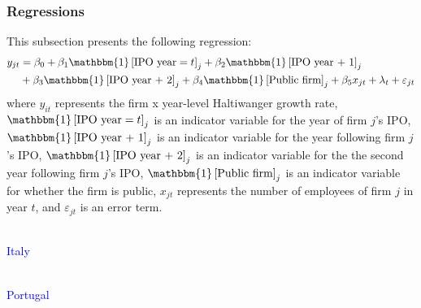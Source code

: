 \documentclass[12pt,notitlepage]{article}
\newcommand{\sym}[1] {\ifmmode^{#1} \else\(^{#1}\) \fi}
\begin{document}
\subsubsection{Regressions}
This subsection presents the following regression:
	\begin{equation}
	\begin{split}
	y_{jt} &= \beta_0 + \beta_1 \mathbbm{1}\left[ \text{IPO year} = t \right]_j + \beta_2 \mathbbm{1}\left[ \text{IPO year + 1}\right]_j \\
	&+ \beta_3 \mathbbm{1}\left[ \text{IPO year + 2} \right]_j + \beta_4 \mathbbm{1}\left[ \text{Public firm} \right]_j + \beta_5 x_{jt} + \lambda_t + \varepsilon_{jt}
	\end{split}
	\end{equation}
where $y_{it}$ represents the firm x year-level Haltiwanger growth rate, $\mathbbm{1}\left[ \text{IPO year} = t \right]_j$ is an indicator variable for the year of firm $j$'s IPO, $\mathbbm{1}\left[ \text{IPO year + 1}\right]_j $ is an indicator variable for the year following firm $j$'s IPO, $\mathbbm{1}\left[ \text{IPO year + 2} \right]_j $ is an indicator variable for the the second year following firm $j$'s IPO, $ \mathbbm{1}\left[ \text{Public firm} \right]_j $ is an indicator variable for whether the firm is public, $x_{jt}$ represents the number of employees of firm $j$ in year $t$, and $\varepsilon_{jt}$ is an error term.\\~\

\textcolor{blue}{Italy}\\~\
\begin{table}[htbp]\centering
\def\sym#1{\ifmmode^{#1}\else\(^{#1}\)\fi}
\caption{Haltiwanger growth rate}
\end{table}

\clearpage

\textcolor{blue}{Portugal}\\~\

\begin{table}[htbp]\centering
\def\sym#1{\ifmmode^{#1}\else\(^{#1}\)\fi}
\caption{Haltiwanger growth rate}
\end{table}
\end{document}
